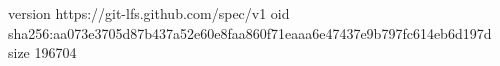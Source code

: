 version https://git-lfs.github.com/spec/v1
oid sha256:aa073e3705d87b437a52e60e8faa860f71eaaa6e47437e9b797fc614eb6d197d
size 196704
